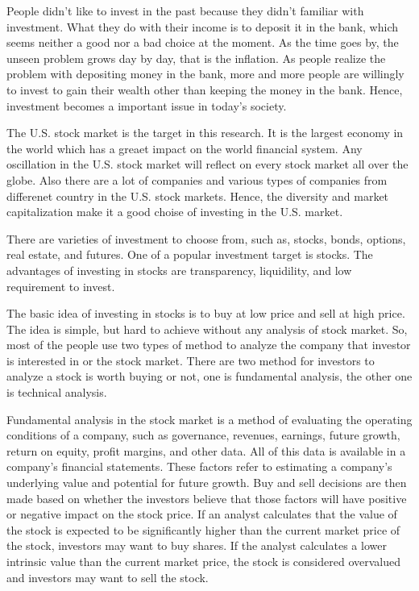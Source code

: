 \documentclass[../main.tex]{subfiles}
\begin{document}

People didn't like to invest in the past because they didn't familiar with investment. What they do with their income is to deposit it in the bank, which seems neither a good nor a bad choice at the moment. As the time goes by, the unseen problem grows day by day, that is the inflation. As people realize the problem with depositing money in the bank, more and more people are willingly to invest to gain their wealth other than keeping the money in the bank. Hence, investment becomes a important issue in today's society.

\bigbreak

The U.S. stock market is the target in this research. It is the largest economy in the world which has a greaet impact on the world financial system. Any oscillation in the U.S. stock market will reflect on every stock market all over the globe. Also there are a lot of companies and various types of companies from differenet country in the U.S. stock markets. Hence, the diversity and market capitalization make it a good choise of investing in the U.S. market.

\bigbreak

There are varieties of investment to choose from, such as, stocks, bonds, options, real estate, and futures. One of a popular investment target is stocks. The advantages of investing in stocks are transparency, liquidility, and low requirement to invest.

\bigbreak

The basic idea of investing in stocks is to buy at low price and sell at high price. The idea is simple, but hard to achieve without any analysis of stock market. So, most of the people use two types of method to analyze the company that investor is interested in or the stock market. There are two method for investors to analyze a stock is worth buying or not, one is fundamental analysis, the other one is technical analysis.

\bigbreak

Fundamental analysis in the stock market is a method of evaluating the operating conditions of a company, such as governance, revenues, earnings, future growth, return on equity, profit margins, and other data. All of this data is available in a company's financial statements. These factors refer to estimating a company's underlying value and potential for future growth. Buy and sell decisions are then made based on whether the investors believe that those factors will have positive or negative impact on the stock price. If an analyst calculates that the value of the stock is expected to be significantly higher than the current market price of the stock, investors may want to buy shares. If the analyst calculates a lower intrinsic value than the current market price, the stock is considered overvalued and investors may want to sell the stock.
\end{document}

